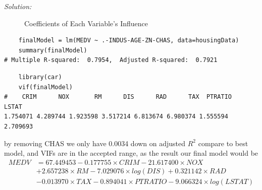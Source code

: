 \documentclass{article}
\newenvironment{solution}
    {\textit{Solution:}}
    {}
\begin{document}
\begin{solution}
\begin{enumerate}
\begin{figure}[h]
		\caption{Coefficients of Each Variable's Influence}
	\end{figure}		
	\begin{lstlisting}
	finalModel = lm(MEDV ~ .-INDUS-AGE-ZN-CHAS, data=housingData)
	summary(finalModel)
# Multiple R-squared:  0.7954,	Adjusted R-squared:  0.7921 
	\end{lstlisting}
	\begin{lstlisting}
	library(car)
	vif(finalModel)
#    CRIM      NOX       RM      DIS      RAD      TAX  PTRATIO    LSTAT 
1.754071 4.289744 1.923598 3.517214 6.813674 6.980374 1.555594 2.709693
	\end{lstlisting}
by removing CHAS we only have 0.0034 down on adjusted $R^2$ compare to best model, and VIFs are in the accepted range, as the result our final model would be
\begin{equation}
\begin{split}
	MEDV & = 67.449453 - 0.177755\times CRIM - 21.617400\times NOX \\ 
	& + 2.657238\times RM - 7.029076\times log(DIS) + 0.321142\times RAD \\
	& - 0.013970\times TAX - 0.894041\times PTRATIO - 9.066324\times log(LSTAT)
\end{split}
\end{equation}		
	\end{enumerate}
\end{solution}
\end{document}
